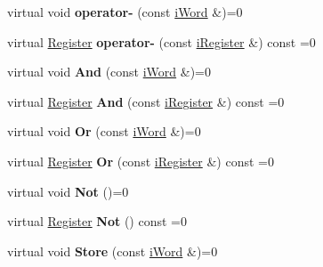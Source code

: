\begin{DoxyCompactItemize}
\item 
\hypertarget{classiRegister_af1698794707672d083f4cef0e7ced6fd}{
virtual void {\bfseries operator-\/} (const \hyperlink{classiWord}{iWord} \&)=0}
\label{classiRegister_af1698794707672d083f4cef0e7ced6fd}

\item 
\hypertarget{classiRegister_a36b54b2ce380b57af8e42674ab8408d4}{
virtual \hyperlink{classRegister}{Register} {\bfseries operator-\/} (const \hyperlink{classiRegister}{iRegister} \&) const =0}
\label{classiRegister_a36b54b2ce380b57af8e42674ab8408d4}

\item 
\hypertarget{classiRegister_ade6c2ceb8b2496d11f4b7a6582b9c736}{
virtual void {\bfseries And} (const \hyperlink{classiWord}{iWord} \&)=0}
\label{classiRegister_ade6c2ceb8b2496d11f4b7a6582b9c736}

\item 
\hypertarget{classiRegister_a66dd4ca0b7fe7ad807e78698d6845801}{
virtual \hyperlink{classRegister}{Register} {\bfseries And} (const \hyperlink{classiRegister}{iRegister} \&) const =0}
\label{classiRegister_a66dd4ca0b7fe7ad807e78698d6845801}

\item 
\hypertarget{classiRegister_a93fa84af6755ef6e924a068f643ae262}{
virtual void {\bfseries Or} (const \hyperlink{classiWord}{iWord} \&)=0}
\label{classiRegister_a93fa84af6755ef6e924a068f643ae262}

\item 
\hypertarget{classiRegister_a20d2328e0c3ccd18c0497d8304597030}{
virtual \hyperlink{classRegister}{Register} {\bfseries Or} (const \hyperlink{classiRegister}{iRegister} \&) const =0}
\label{classiRegister_a20d2328e0c3ccd18c0497d8304597030}

\item 
\hypertarget{classiRegister_af4bbbe945b151dee3f1743c43a451cb3}{
virtual void {\bfseries Not} ()=0}
\label{classiRegister_af4bbbe945b151dee3f1743c43a451cb3}

\item 
\hypertarget{classiRegister_aca99e377de5cd1ef136a850d85143cf3}{
virtual \hyperlink{classRegister}{Register} {\bfseries Not} () const =0}
\label{classiRegister_aca99e377de5cd1ef136a850d85143cf3}

\item 
\hypertarget{classiRegister_a61c9274f3787f79d64a2d28c49b382c9}{
virtual void {\bfseries Store} (const \hyperlink{classiWord}{iWord} \&)=0}
\label{classiRegister_a61c9274f3787f79d64a2d28c49b382c9}


\end{DoxyCompactItemize}
